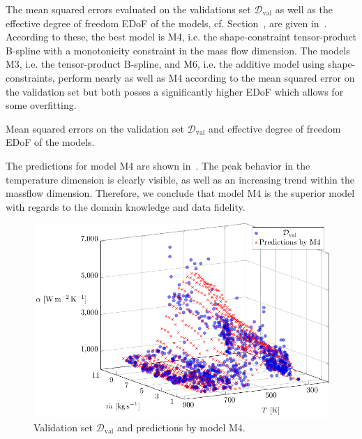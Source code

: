 The mean squared errors evaluated on the validations set $\mathcal{D}_{\text{val}}$ as well as the effective degree of freedom EDoF of the models, cf. Section~, are given in~. According to these, the best model is M4, i.e. the shape-constraint tensor-product B-spline with a monotonicity constraint in the mass flow dimension. The models M3, i.e. the tensor-product B-spline, and M6, i.e. the additive model using shape-constraints, perform nearly as well as M4 according to the mean squared error on the validation set but both posses a significantly higher EDoF which allows for some overfitting. 

\begin{table}[H]
	\begin{center}
	\end{center}
	\caption{Mean squared errors on the validation set $\mathcal{D}_{\text{val}}$ and effective degree of freedom EDoF of the models.}
	\label{tab:ebner-mse-val}
\end{table}

The predictions for model M4 are shown in~. The peak behavior in the temperature dimension is clearly visible, as well as an increasing trend within the massflow dimension. Therefore, we conclude that model M4 is the superior model with regards to the domain knowledge and data fidelity. 

\begin{figure}[H]
	\centering
	\includegraphics[width=\columnwidth]{graphics/pgfplots/cha5/Ebner/M4.pdf}
	\caption{Validation set $\mathcal{D}_{\text{val}}$ and predictions by model M4.}
	\label{fig:ebner-M4}
\end{figure}

